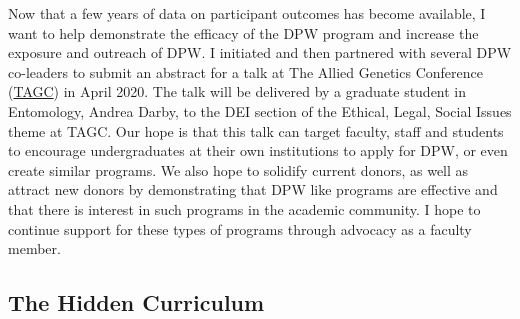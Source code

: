 \documentclass[11pt]{article}
\newcommand{\amy}[1]{{\color{amyCol} [\textbf{Amy:} #1]}}
\begin{document}
Now that a few years of data on participant outcomes has become available, I want to help demonstrate the efficacy of the DPW program and increase the exposure and outreach of DPW. I initiated and then partnered with several DPW co-leaders to submit an abstract for a talk at The Allied Genetics Conference (\href{https://genetics-gsa.org/tagc-2020/}{TAGC}) in April 2020. The talk will be delivered by a graduate student in Entomology, Andrea Darby, to the DEI section of the Ethical, Legal, Social Issues theme at TAGC. Our hope is that this talk can target faculty, staff and students to encourage undergraduates at their own institutions to apply for DPW, or even create similar programs. We also hope to solidify current donors, as well as attract new donors by demonstrating that DPW like programs are effective and that there is interest in such programs in the academic community. I hope to continue support for these types of programs through advocacy as a faculty member.  


\subsection*{The Hidden Curriculum}


\end{document}
